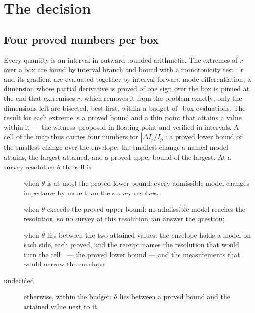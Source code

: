 \documentclass[preprint,11pt,authoryear]{elsarticle}
\begin{document}
\section{The decision}\label{sec:decision}

\subsection{Four proved numbers per box}
Every quantity is an interval in outward-rounded arithmetic. The extremes of $r$ over a box are found by interval branch and bound with a monotonicity test \citep{hansen2004}: $r$ and its gradient are evaluated together by interval forward-mode differentiation; a dimension whose partial derivative is proved of one sign over the box is pinned at the end that extremises $r$, which removes it from the problem exactly; only the dimensions left are bisected, best-first, within a budget of \DBudget\ box evaluations. The result for each extreme is a proved bound and a thin point that attains a value within it --- the witness, proposed in floating point and verified in intervals. A cell of the map thus carries four numbers for $|\Delta I_p/I_p|$: a proved lower bound of the smallest change over the envelope, the smallest change a named model attains, the largest attained, and a proved upper bound of the largest. At a survey resolution $\theta$ the cell is
\begin{description}
\item[\vProved] when $\theta$ is at most the proved lower bound: every admissible model changes impedance by more than the survey resolves;
\item[\vRefuted] when $\theta$ exceeds the proved upper bound: no admissible model reaches the resolution, so no survey at this resolution can answer the question;
\item[\vRefused] when $\theta$ lies between the two attained values: the envelope holds a model on each side, each proved, and the receipt names the resolution that would turn the cell \vProved\ --- the proved lower bound --- and the measurements that would narrow the envelope;
\item[undecided] otherwise, within the budget: $\theta$ lies between a proved bound and the attained value next to it.
\end{description}
\end{document}
